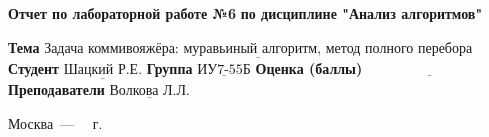 \begin{titlepage}
	\begin{center}
		\noindent\begin{minipage}{1.3\textwidth}
					 \centering
					 \Large\textbf{Отчет по лабораторной работе №6}\newline
					 \textbf{по дисциплине "Анализ алгоритмов"}\newline\newline
		\end{minipage}
	\end{center}

	\noindent\textbf{Тема} $\underline{\text{Задача коммивояжёра: муравьиный алгоритм, метод полного перебора}}$\newline\newline
	\noindent\textbf{Студент} $\underline{\text{Шацкий Р.Е.}}$\newline\newline
	\noindent\textbf{Группа} $\underline{\text{ИУ7-55Б}}$\newline\newline
	\noindent\textbf{Оценка (баллы)} $\underline{\text{~~~~~~~~~~~~~~~~~~~~~~~~~~~}}$\newline\newline
	\noindent\textbf{Преподаватели} $\underline{\text{Волкова Л.Л.}}$\newline\newline\newline

	\begin{center}
		\vfill
		Москва~---~\the\year
		~г.
	\end{center}
\end{titlepage}
